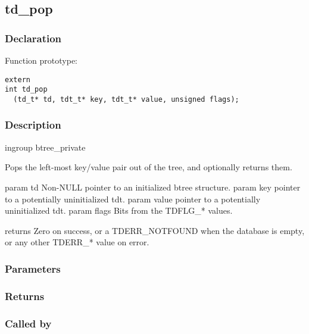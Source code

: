 
\newpage
\subsection{td\_pop}
\subsubsection{Declaration} Function prototype:

\begin{verbatim}
extern
int td_pop
  (td_t* td, tdt_t* key, tdt_t* value, unsigned flags);
\end{verbatim}

\subsubsection{Description}

 
 ingroup btree\_private 

 Pops the left-most key/value pair out of the tree, and optionally
 returns them.

 param td Non-NULL pointer to an initialized btree structure.
 param key pointer to a potentially uninitialized tdt.
 param value pointer to a potentially uninitialized tdt.
 param flags Bits from the TDFLG\_* values.

 returns Zero on success, or a TDERR\_NOTFOUND when the database
 is empty, or any other TDERR\_* value on error.
 

\subsubsection{Parameters}
\subsubsection{Returns}
\subsubsection{Called by}
